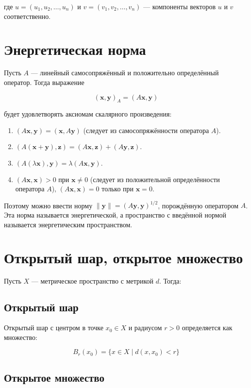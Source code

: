 \documentclass{article}
\begin{document}
где $u = (u_1, u_2, \ldots, u_n)$ и $v = (v_1, v_2, \ldots, v_n)$ — компоненты векторов $u$ и $v$ соответственно.

\section{Энергетическая норма}
Пусть $A$ — линейный самосопряжённый и положительно определённый оператор. Тогда выражение

\[
( \mathbf{x}, \mathbf{y})_A = (A \mathbf{x}, \mathbf{y})
\]

будет удовлетворять аксиомам скалярного произведения:
\begin{enumerate}
    \item $(A \mathbf{x}, \mathbf{y}) = (\mathbf{x}, A \mathbf{y})$ (следует из самосопряжённости оператора $A$).
    \item $(A (\mathbf{x} + \mathbf{y}), \mathbf{z}) = (A \mathbf{x}, \mathbf{z}) + (A \mathbf{y}, \mathbf{z})$.
    \item $(A (\lambda \mathbf{x}), \mathbf{y}) = \lambda (A \mathbf{x}, \mathbf{y})$.
    \item $(A \mathbf{x}, \mathbf{x}) > 0$ при $\mathbf{x} \neq 0$ (следует из положительной определённости оператора $A$), $(A \mathbf{x}, \mathbf{x}) = 0$ только при $\mathbf{x} = 0$.
\end{enumerate}

Поэтому можно ввести норму $\| \mathbf{y} \| = (A \mathbf{y}, \mathbf{y})^{1/2}$, порождённую оператором $A$. Эта норма называется энергетической, а пространство с введённой нормой называется энергетическим пространством.

\section{Открытый шар, открытое множество}
Пусть $X$ — метрическое пространство с метрикой $d$. Тогда:

\subsection{Открытый шар}

Открытый шар с центром в точке $x_0 \in X$ и радиусом $r > 0$ определяется как множество:

\[
B_r(x_0) = \{ x \in X \mid d(x, x_0) < r \}
\]

\subsection{Открытое множество}
\end{document}
